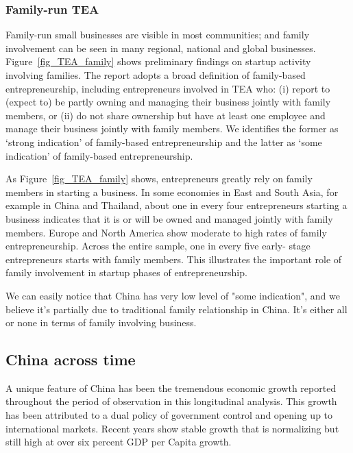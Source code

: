 \documentclass[10pt]{article}
\begin{document}
\subsubsection{Family-run TEA}

Family-run small businesses are visible in most communities; and family involvement can be seen in many regional, national and global businesses. Figure~\ref{fig_TEA_family} shows preliminary findings on startup activity involving families. The report adopts a broad definition of family-based entrepreneurship, including entrepreneurs involved in TEA who: (i) report to (expect to) be partly owning and managing their business jointly with family members, or (ii) do not share ownership but have at least one employee and manage their business jointly with family members. We identifies the former as ‘strong indication’ of family-based entrepreneurship and the latter as ‘some indication’ of family-based entrepreneurship.

As Figure~\ref{fig_TEA_family} shows, entrepreneurs greatly rely on family members in starting a business. In some economies in East and South
Asia, for example in China and Thailand, about one in every four entrepreneurs starting a business indicates that it is or will be owned and managed jointly with family members. Europe and North America show moderate to high rates of family entrepreneurship. Across the entire sample, one in every five early- stage entrepreneurs starts with family members. This illustrates the important role of family involvement in startup phases of entrepreneurship.

We can easily notice that China has very low level of "some indication", and we believe it's partially due to traditional family relationship in China. It's either all or none in terms of family involving business.

\subsection{China across time}

A unique feature of China has been the tremendous economic growth reported throughout the period of observation in this longitudinal analysis.
This growth has been attributed to a dual policy
of government control and opening up to international markets. Recent years show stable growth that is normalizing but still high at over six percent GDP per Capita growth.
\end{document}
